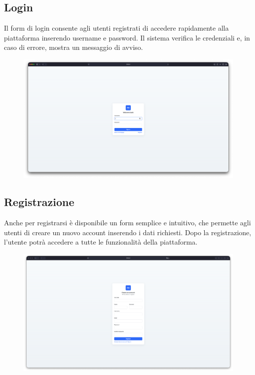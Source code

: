 \documentclass[a4paper,12pt]{report}
\begin{document}
\newpage
\subsection*{Login}

Il form di login consente agli utenti registrati di accedere
rapidamente alla piattaforma inserendo username e
password. Il sistema verifica le credenziali e, in caso di errore,
mostra un messaggio di avviso.

\begin{figure}[H]
  \centering
  \includegraphics[width=\textwidth, trim=0 0 0 0]{./img/login.png}
  \vspace{-1em}
  \label{fig:login}
\end{figure}

\subsection*{Registrazione}
Anche per registrarsi è disponibile un form semplice e intuitivo, che
permette agli utenti di creare un nuovo
account inserendo i dati richiesti. Dopo la registrazione, l'utente
potrà accedere a tutte le funzionalità della
piattaforma.

\begin{figure}[H]
  \centering
  \includegraphics[width=\textwidth, trim=0 0 0 0]{./img/register.png}
  \vspace{-1em}
  \label{fig:registrazione}
\end{figure}
\end{document}
